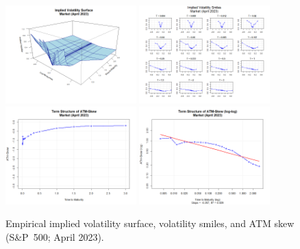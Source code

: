 \begin{figure}[H]
    \centering
    \includegraphics[width=0.45\textwidth]{figures/A.1 Market Surface/market_apr-23_iv_surface.png}
    \includegraphics[width=0.45\textwidth]{figures/A.1 Market Surface/market_apr-23_iv_smiles.png}
    \includegraphics[width=0.45\textwidth]{figures/A.1 Market Surface/market_apr-23_atm_skew.png}
    \includegraphics[width=0.45\textwidth]{figures/A.1 Market Surface/market_apr-23_atm_skew_log.png}
    \caption{Empirical implied volatility surface, volatility smiles, and ATM skew (S\&P~500; April 2023).}
    \label{fig:MarketSurfaceApr2023}
\end{figure}

